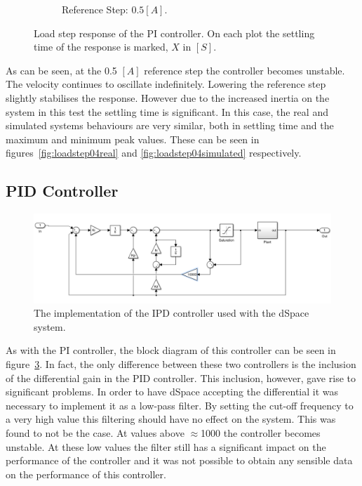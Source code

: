 \begin{figure}
\begin{subfigure}[t]{.49\linewidth}
		\caption{Reference Step: $0.5 [A]$.}
		\label{fig:}
	\end{subfigure}
	\caption[Load step response of PI controller]{Load step response of the PI controller. On each plot the settling time of the response is marked, $X$ in $[S]$.}
	\label{fig:loadstep}
\end{figure}

As can be seen, at the 0.5 $[A]$ reference step the controller becomes unstable.
The velocity continues to oscillate indefinitely.
Lowering the reference step slightly stabilises the response.
However due to the increased inertia on the system in this test the settling time is significant.
In this case, the real and simulated systems behaviours are very similar, both in settling time and the maximum and minimum peak values.
These can be seen in figures~\ref{fig:loadstep04real} and \ref{fig:loadstep04simulated} respectively.

\subsection{PID Controller}
\begin{figure}[!h]
	\centering
	\includegraphics[width=.75\linewidth]{graphics/ipd_controller}
	\caption{The implementation of the IPD controller used with the dSpace system.}
	\label{fig:ipdcontroller}
\end{figure}

As with the PI controller, the block diagram of this controller can be seen in figure~\ref{fig:ipdcontroller}.
In fact, the only difference between these two controllers is the inclusion of the differential gain in the PID controller.
This inclusion, however, gave rise to significant problems.
In order to have dSpace accepting the differential it was necessary to implement it as a low-pass filter.
By setting the cut-off frequency to a very high value this filtering should have no effect on the system.
This was found to not be the case. 
At values above $\approx$1000 the controller becomes unstable.
At these low values the filter still has a significant impact on the performance of the controller and it was not possible to obtain any sensible data on the performance of this controller.

